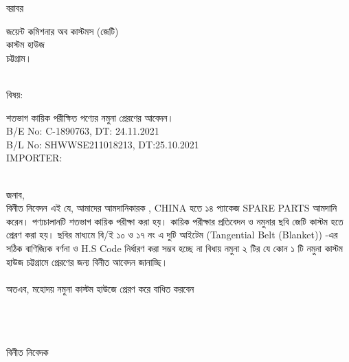 \documentclass[12pt]{article}
\newcommand{\beno}{C-1890763}
\newcommand{\bedt}{24.11.2021}
\newcommand{\blno}{SHWWSE211018213}
\newcommand{\bldt}{25.10.2021}
\newcommand{\good}{SPARE PARTS}
\newcommand{\co}{CHINA}
\newcommand{\impn}{\htf}
\begin{document}
\noindent
বরাবর
\\
\begin{minipage}[t]{0.06\linewidth}
\hspace{1em}
\end{minipage}
\begin{minipage}[t]{0.94\linewidth}
জয়েন্ট কমিশনার অব কাস্টমস (জেটি)
\\
কাস্টম হাউজ
\\
চট্টগ্রাম।
\\
\\
\end{minipage}
\begin{minipage}[t]{0.06\linewidth}
বিষয়:
\end{minipage}
\begin{minipage}[t]{0.94\linewidth}
শতভাগ কায়িক পরীক্ষিত পণ্যের নমুনা প্রেরণের আবেদন।
\\
B/E No: {\beno}, DT: {\bedt}
\\
B/L No: {\blno}, DT:{\bldt}
\\
IMPORTER: {\impn}
\\
\\
\end{minipage}
জনাব,
\\
\hspace*{2.7em}বিনীত নিবেদন এই যে, আমাদের আমদানিকারক {\impn},
{\co} হতে ১৪ প্যাকেজ {\good}
আমদানি করেন।
পণ্যচালানটি শতভাগ কায়িক পরীক্ষা
করা হয়। কায়িক পরীক্ষার প্রতিবেদন ও নমুনার ছবি
জেটি কাস্টম হতে প্রেরণ করা হয়।
ছবির মাধ্যমে বি/ই ১০ ও ১৭ নং এ দুটি আইটেম
(Tangential Belt (Blanket))
-এর
সঠিক
বাণিজ্যিক বর্ণনা ও H.S Code নির্ধারণ করা সম্ভব হচ্ছে না
বিধায় নমুনা
২ টির যে কোন ১ টি নমুনা
কাস্টম হাউজ চট্টগ্রামে প্রেরণের জন্য বিনীত আবেদন জানাচ্ছি।
\\
\\
অতএব, মহোদয়
নমুনা কাস্টম হাউজে প্রেরণ করে বাধিত
করবেন
\\
\\
\\
\\
\begin{minipage}[t]{0.50\linewidth}
\hspace{1em}
\end{minipage}
\begin{minipage}[t]{0.60\linewidth}
বিনীত নিবেদক
\\
\\
\\
\\
\\
{\cnfn}
\end{minipage}
\thispagestyle{laststyle}
\end{document}
